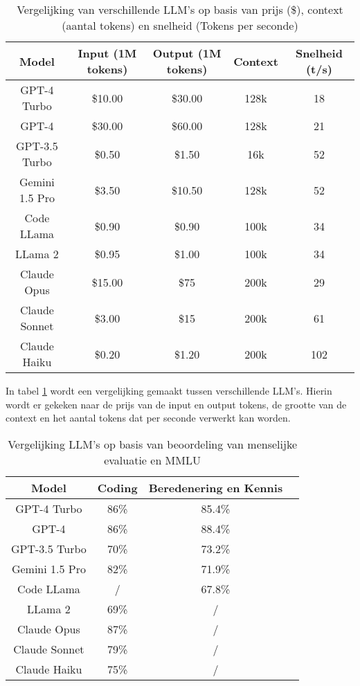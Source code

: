 \begin{table}[h!]
\centering
\small
\begin{tabular}{|c|c|c|c|c|} 
  \hline
  Model & Input (1M tokens) & Output (1M tokens) & Context & Snelheid (t/s)\\ [0.5ex] 
  \hline
  GPT-4 Turbo \autocite{OpenAi2024} & \$10.00 & \$30.00 &  128k & 18\\ 
  \hline
  GPT-4 \autocite{OpenAi2024} & \$30.00 & \$60.00 &  128k & 21\\ 
  \hline
  GPT-3.5 Turbo \autocite{OpenAi2024} & \$0.50 & \$1.50 &  16k & 52\\
  \hline
  Gemini 1.5 Pro \textcite{Google2024} & \$3.50 & \$10.50 &  128k & 52\\
  \hline
  Code LLama \autocite{Meta2024} & \$0.90 & \$0.90 & 100k & 34\\
  \hline
  LLama 2 \autocite{Meta2024} & \$0.95 & \$1.00 & 100k & 34\\
  \hline
  Claude Opus \autocite{Anthropic2023} & \$15.00  & \$75 &  200k & 29\\
  \hline
  Claude Sonnet \autocite{Anthropic2023} & \$3.00  & \$15 &  200k & 61\\ 
  \hline
  Claude Haiku \autocite{Anthropic2023} & \$0.20  & \$1.20 &  200k & 102\\
  \hline
\end{tabular}
\caption{Vergelijking van verschillende LLM's op basis van prijs (\$), context (aantal tokens) en snelheid (Tokens per seconde) \autocite{ArtificialAnalysis2024}}
\label{table:vgl-llms}
\end{table}

In tabel \ref{table:vgl-llms} wordt een vergelijking gemaakt tussen verschillende LLM's.
Hierin wordt er gekeken naar de prijs van de input en output tokens, de grootte van de context en het aantal tokens dat per seconde verwerkt kan worden.

\begin{table}[h!]
\centering
\small
\begin{tabular}{|c|c|c|c|}
\hline
Model & Coding & Beredenering en Kennis\\
\hline
GPT-4 Turbo \autocite{OpenAi2024} & 86\% & 85.4\% \\
\hline
GPT-4 \autocite{OpenAi2024} & 86\% & 88.4\% \\
\hline
GPT-3.5 Turbo \autocite{OpenAi2024} & 70\% & 73.2\% \\
\hline
Gemini 1.5 Pro \textcite{Google2024} & 82\% & 71.9\% \\
\hline
Code LLama \autocite{Meta2024} & /  & 67.8\% \\
\hline
LLama 2 \autocite{Meta2024} & 69\%  & / \\
\hline
Claude Opus \autocite{Anthropic2023} & 87\%  & / \\
\hline
Claude Sonnet \autocite{Anthropic2023} & 79\%  & / \\
\hline
Claude Haiku \autocite{Anthropic2023} & 75\%  & / \\
\hline
\end{tabular}
\caption{Vergelijking LLM's op basis van beoordeling van menselijke evaluatie en MMLU \autocite{ArtificialAnalysis2024}}
\label{table:vgl-llms-eval}
\end{table}


